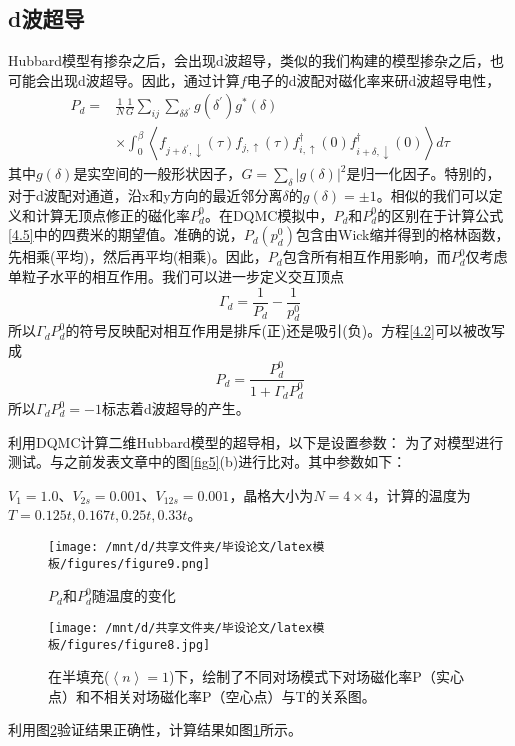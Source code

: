 \subsection{d波超导}
Hubbard模型有掺杂之后，会出现d波超导，类似的我们构建的模型掺杂之后，也可能会出现d波超导。因此，通过计算$f$电子的d波配对磁化率来研d波超导电性，
\begin{equation}
    \begin{aligned}
    P_{d}=& \frac{1}{N} \frac{1}{G} \sum_{i j} \sum_{\delta \delta^{\prime}} g\left(\delta^{\prime}\right) g^{*}(\delta) \\
    & \times \int_{0}^{\beta}\left\langle f_{j+\delta^{\prime}, \downarrow}(\tau) f_{j, \uparrow}(\tau) f_{i, \uparrow}^{\dagger}(0) f_{i+\delta, \downarrow}^{\dagger}(0)\right\rangle d \tau
    \label{4.5}
    \end{aligned}
\end{equation}
其中$g(\delta)$是实空间的一般形状因子，$G=\sum_\delta |g(\delta)|^2$是归一化因子。特别的，对于d波配对通道，沿x和y方向的最近邻分离$\delta$的$g(\delta)=\pm 1$。相似的我们可以定义和计算无顶点修正的磁化率$P^0_d$。在DQMC模拟中，$P_d$和$P^0_d$的区别在于计算公式\ref{4.5}中的四费米的期望值。准确的说，$P_d(p^0_d)$包含由Wick缩并得到的格林函数，先相乘(平均)，然后再平均(相乘)。因此，$P_d$包含所有相互作用影响，而$P^0_d$仅考虑单粒子水平的相互作用。我们可以进一步定义交互顶点
\begin{equation}
    \Gamma_d=\frac{1}{P_d}-\frac{1}{p^0_d}
    \label{4.2}
\end{equation}
所以$\Gamma_d P^0_d$的符号反映配对相互作用是排斥(正)还是吸引(负)。方程\ref{4.2}可以被改写成
\begin{equation}
    P_d=\frac{P^0_d}{1+\Gamma_d P^0_d}
\end{equation}
所以$\Gamma_d P^0_d=-1$标志着d波超导的产生。

利用DQMC计算二维Hubbard模型的超导相，以下是设置参数：
为了对模型进行测试。与之前发表文章中的图\ref{fig5}(b)进行比对。其中参数如下：

$V_1=1.0$、$V_{2s}=0.001$、$V_{12s}=0.001$，晶格大小为$N=4 \times 4$，计算的温度为$T=0.125t, 0.167t, 0.25t, 0.33t$。

\begin{figure}[H]
    \centering
    \texttt{[image: /mnt/d/共享文件夹/毕设论文/latex模板/figures/figure9.png]}
    \caption{$P_d$和$P_d^0$随温度的变化}
    \label{fig9}
\end{figure}

\begin{figure}[H]
    \centering
    \texttt{[image: /mnt/d/共享文件夹/毕设论文/latex模板/figures/figure8.jpg]}
    \caption{在半填充($\left \langle n \right \rangle=1$)下，绘制了不同对场模式下对场磁化率P（实心点）和不相关对场磁化率P（空心点）与T的关系图\cite{11}。}
    \label{fig8}
\end{figure}

利用图\ref{fig8}验证结果正确性，计算结果如图\ref{fig9}所示。



























